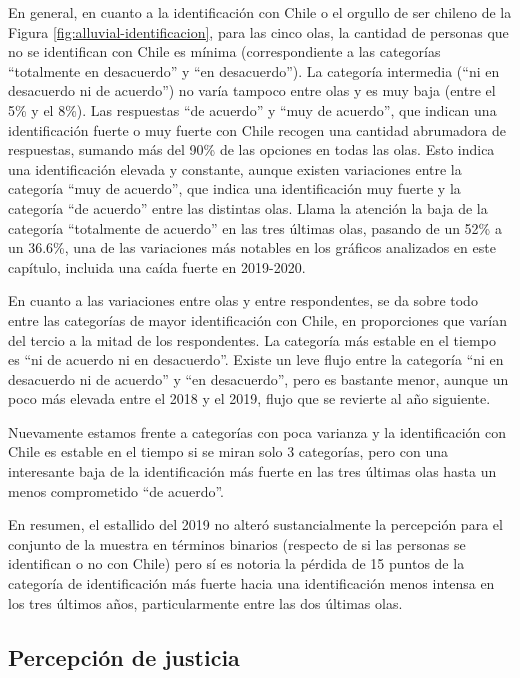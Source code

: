 \documentclass[
  12pt,
]{book}
\begin{document}
En general, en cuanto a la identificación con Chile o el orgullo de ser chileno de la Figura \ref{fig:alluvial-identificacion}, para las cinco olas, la cantidad de personas que no se identifican con Chile es mínima (correspondiente a las categorías ``totalmente en desacuerdo'' y ``en desacuerdo''). La categoría intermedia (``ni en desacuerdo ni de acuerdo'') no varía tampoco entre olas y es muy baja (entre el 5\% y el 8\%). Las respuestas ``de acuerdo'' y ``muy de acuerdo'', que indican una identificación fuerte o muy fuerte con Chile recogen una cantidad abrumadora de respuestas, sumando más del 90\% de las opciones en todas las olas. Esto indica una identificación elevada y constante, aunque existen variaciones entre la categoría ``muy de acuerdo'', que indica una identificación muy fuerte y la categoría ``de acuerdo'' entre las distintas olas. Llama la atención la baja de la categoría ``totalmente de acuerdo'' en las tres últimas olas, pasando de un 52\% a un 36.6\%, una de las variaciones más notables en los gráficos analizados en este capítulo, incluida una caída fuerte en 2019-2020.

En cuanto a las variaciones entre olas y entre respondentes, se da sobre todo entre las categorías de mayor identificación con Chile, en proporciones que varían del tercio a la mitad de los respondentes. La categoría más estable en el tiempo es ``ni de acuerdo ni en desacuerdo''. Existe un leve flujo entre la categoría ``ni en desacuerdo ni de acuerdo'' y ``en desacuerdo'', pero es bastante menor, aunque un poco más elevada entre el 2018 y el 2019, flujo que se revierte al año siguiente.

Nuevamente estamos frente a categorías con poca varianza y la identificación con Chile es estable en el tiempo si se miran solo 3 categorías, pero con una interesante baja de la identificación más fuerte en las tres últimas olas hasta un menos comprometido ``de acuerdo''.

En resumen, el estallido del 2019 no alteró sustancialmente la percepción para el conjunto de la muestra en términos binarios (respecto de si las personas se identifican o no con Chile) pero sí es notoria la pérdida de 15 puntos de la categoría de identificación más fuerte hacia una identificación menos intensa en los tres últimos años, particularmente entre las dos últimas olas.

\hypertarget{percepciuxf3n-de-justicia}{%
\subsection{Percepción de justicia}\label{percepciuxf3n-de-justicia}}
\end{document}
